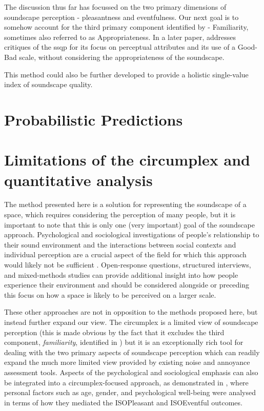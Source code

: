 The discussion thus far has focussed on the two primary dimensions of soundscape perception - pleasantness and eventfulness. Our next goal is to somehow account for the third primary component identified by \citet{Axelsson2010principal} - Familiarity, sometimes also referred to as Appropriateness. In a later paper, \citet{Axelsson2015How} addresses critiques of the \gls{ssqp} for its focus on perceptual attributes and its use of a Good-Bad scale, without considering the appropriateness of the soundscape. 

This method could also be further developed to provide a holistic single-value index of soundscape quality.

\section{Probabilistic Predictions}



\section{Limitations of the circumplex and quantitative analysis}
The method presented here is a solution for representing the soundscape of a space, which requires considering the perception of many people, but it is important to note that this is only one (very important) goal of the soundscape approach. Psychological and sociological investigations of people's relationship to their sound environment and the interactions between social contexts and individual perception are a crucial aspect of the field for which this approach would likely not be sufficient \citep{Bild2018Public}. Open-response questions, structured interviews, and mixed-methods studies can provide additional insight into how people experience their environment and should be considered alongside or preceding this focus on how a space is likely to be perceived on a larger scale.

These other approaches are not in opposition to the methods proposed here, but instead further expand our view. The circumplex is a limited view of soundscape perception (this is made obvious by the fact that it excludes the third component, \emph{familiarity}, identified in \citet{Axelsson2010principal}) but it is an exceptionally rich tool for dealing with the two primary aspects of soundscape perception which can readily expand the much more limited view provided by existing noise and annoyance assessment tools. Aspects of the psychological and sociological emphasis can also be integrated into a circumplex-focused approach, as demonstrated in \citet{Erfanian2021Psychological}, where personal factors such as age, gender, and psychological well-being were analysed in terms of how they mediated the ISOPleasant and ISOEventful outcomes.

